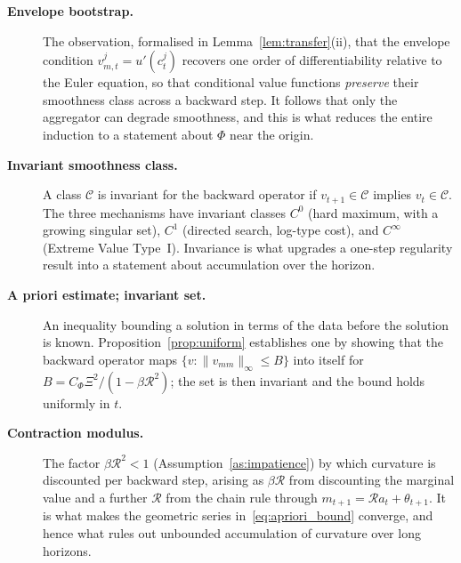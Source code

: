\begin{description}

\item[\textnormal{\textbf{Envelope bootstrap.}}]
The observation, formalised in Lemma~\ref{lem:transfer}(ii), that the envelope condition
$v_{m,t}^{j}=u'(c_t^{j})$ recovers one order of differentiability relative to the Euler
equation, so that conditional value functions \emph{preserve} their smoothness class
across a backward step. It follows that only the aggregator can degrade smoothness, and
this is what reduces the entire induction to a statement about $\Phi$ near the origin.

\item[\textnormal{\textbf{Invariant smoothness class.}}]
A class $\mathcal{C}$ is invariant for the backward operator if $v_{t+1}\in\mathcal{C}$
implies $v_{t}\in\mathcal{C}$. The three mechanisms have invariant classes $C^{0}$
(hard maximum, with a growing singular set), $C^{1}$ (directed search, log-type cost),
and $C^{\infty}$ (Extreme Value Type~I). Invariance is what upgrades a one-step
regularity result into a statement about accumulation over the horizon.

\item[\textnormal{\textbf{A priori estimate; invariant set.}}]
An inequality bounding a solution in terms of the data before the solution is known.
Proposition~\ref{prop:uniform} establishes one by showing that the backward operator
maps $\{v:\lVert v_{mm}\rVert_{\infty}\le B\}$ into itself for
$B=C_\Phi\Xi^{2}/(1-\beta\mathcal{R}^{2})$; the set is then invariant and the bound holds
uniformly in $t$.

\item[\textnormal{\textbf{Contraction modulus.}}]
The factor $\beta\mathcal{R}^{2}<1$ (Assumption~\ref{as:impatience}) by which curvature
is discounted per backward step, arising as $\beta\mathcal{R}$ from discounting the
marginal value and a further $\mathcal{R}$ from the chain rule through
$m_{t+1}=\mathcal{R}a_t+\theta_{t+1}$. It is what makes the geometric series
in~\eqref{eq:apriori_bound} converge, and hence what rules out unbounded accumulation of
curvature over long horizons.

\end{description}
